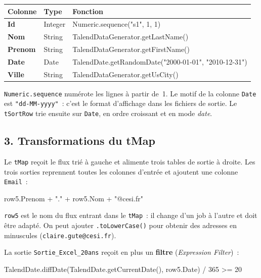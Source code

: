\begin{center}
\small
\begin{tabularx}{\textwidth}{>{\bfseries}l l >{\ttfamily\raggedright\arraybackslash}X}
\toprule
Colonne & Type & \normalfont\textbf{Fonction} \\
\midrule
Id & Integer & Numeric.sequence("s1", 1, 1) \\
Nom & String & TalendDataGenerator.getLastName() \\
Prenom & String & TalendDataGenerator.getFirstName() \\
Date & Date & TalendDate.getRandomDate("2000-01-01", "2010-12-31") \\
Ville & String & TalendDataGenerator.getUsCity() \\
\bottomrule
\end{tabularx}
\end{center}

\noindent \texttt{Numeric.sequence} numérote les lignes à partir de~1. Le motif de la colonne \texttt{Date} est \texttt{"dd-MM-yyyy"}~: c'est le format d'affichage dans les fichiers de sortie. Le \texttt{tSortRow} trie ensuite sur \texttt{Date}, en ordre croissant et en mode \textit{date}.

\subsection*{3. Transformations du tMap}
{}

\noindent Le \texttt{tMap} reçoit le flux trié à gauche et alimente trois tables de sortie à droite. Les trois sorties reprennent toutes les colonnes d'entrée et ajoutent une colonne \texttt{Email}~:

\begin{code}[title=\textbf{Colonne Email} (les trois sorties)]
row5.Prenom + "." + row5.Nom + "@cesi.fr"
\end{code}

\noindent \texttt{row5} est le nom du flux entrant dans le \texttt{tMap}~: il change d'un job à l'autre et doit être adapté. On peut ajouter \texttt{.toLowerCase()} pour obtenir des adresses en minuscules (\texttt{claire.gute@cesi.fr}).

\noindent La sortie \texttt{Sortie\_Excel\_20ans} reçoit en plus un \textbf{filtre} (\textit{Expression Filter})~:

\begin{code}[title=\textbf{Filtre du sujet}~: âge approché en jours]
TalendDate.diffDate(TalendDate.getCurrentDate(), row5.Date) / 365 >= 20
\end{code}

